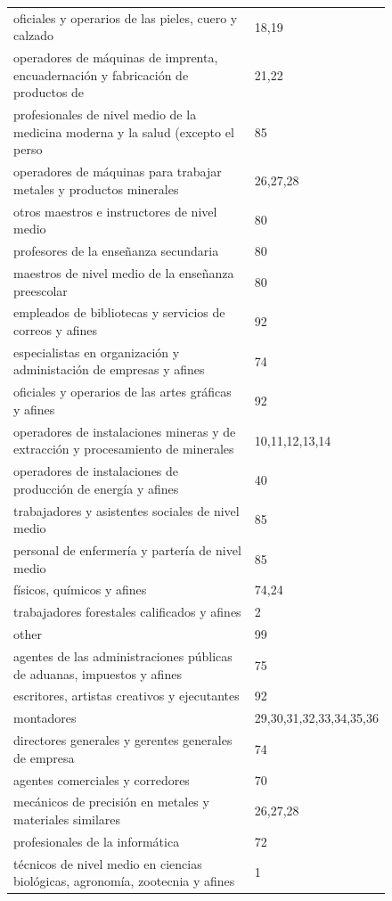 \documentclass[12pt]{article}
\begin{document}
\begin{figure}[H]
\begin{center}
\begin{tabular}{ll}
oficiales y operarios de las pieles, cuero y calzado & 18,19\\
operadores de m\'{a}quinas de imprenta, encuadernaci\'{o}n y fabricaci\'{o}n de productos de & 21,22\\
profesionales de nivel medio de la medicina moderna y la salud (excepto el perso & 85\\
operadores de m\'{a}quinas para trabajar metales y productos minerales & 26,27,28\\
otros maestros e instructores de nivel medio & 80\\
profesores de la ense\~{n}anza secundaria & 80\\
maestros de nivel medio de la ense\~{n}anza preescolar & 80\\
empleados de bibliotecas y servicios de correos y afines & 92\\
especialistas en organizaci\'{o}n y administaci\'{o}n de empresas  y afines & 74\\
oficiales y operarios de las artes gr\'{a}ficas y afines & 92\\
operadores de instalaciones mineras y de extracci\'{o}n y procesamiento de minerales & 10,11,12,13,14\\
operadores de instalaciones de producci\'{o}n de energ\'{i}a y afines & 40\\
trabajadores y asistentes sociales de nivel medio & 85\\
personal de enfermer\'{i}a y parter\'{i}a de nivel medio & 85\\
f\'{i}sicos, qu\'{i}micos y afines & 74,24\\
trabajadores forestales calificados y afines & 2\\
other & 99\\
agentes de las administraciones p\'{u}blicas de aduanas, impuestos y afines & 75\\
escritores, artistas creativos y ejecutantes & 92\\
montadores & 29,30,31,32,33,34,35,36\\
directores generales y gerentes generales de empresa & 74\\
agentes comerciales y corredores & 70\\
mec\'{a}nicos de precisi\'{o}n en metales y materiales similares & 26,27,28\\
profesionales de la inform\'{a}tica & 72\\
t\'{e}cnicos de nivel medio en ciencias biol\'{o}gicas, agronom\'{i}a, zootecnia y afines & 1\\

\end{tabular}
\end{center}
\end{figure}
\end{document}
